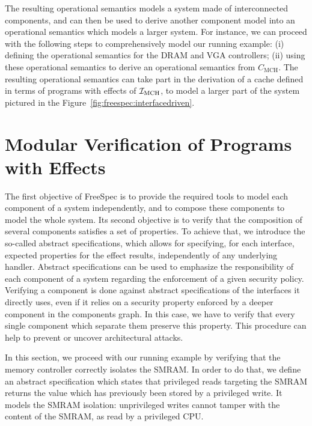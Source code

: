 %
The resulting operational semantics models a system made of interconnected
components, and can then be used to derive another component model into an
operational semantics which models a larger system.
%
For instance, we can proceed with the following steps to comprehensively model
our running example: (i) defining the operational semantics for the DRAM and VGA
controllers; (ii) using these operational semantics to derive an operational
semantics from $C_{\mathrm{MCH}}$.
%
The resulting operational semantics can take part in the derivation of a cache
defined in terms of programs with effects of $\mathcal{I}_{\mathrm{MCH}}$, to model a
larger part of the system pictured in the
Figure~\ref{fig:freespec:interfacedriven}.

\section{Modular Verification of Programs with Effects}
\label{sec:freespec:verifying}

The first objective of FreeSpec is to provide the required tools to model each
component of a system independently, and to compose these components to model
the whole system.
%
Its second objective is to verify that the composition of several components
satisfies a set of properties.
%
To achieve that, we introduce the so-called abstract specifications, which
allows for specifying, for each interface, expected properties for the effect
results, independently of any underlying handler.
%
Abstract specifications can be used to emphasize the responsibility of each
component of a system regarding the enforcement of a given security policy.
%
Verifying a component is done against abstract specifications of the interfaces
it directly uses, even if it relies on a security property enforced by a deeper
component in the components graph.
%
In this case, we have to verify that every single component which separate them
preserve this property.
%
This procedure can help to prevent or uncover architectural attacks.

In this section, we proceed with our running example by verifying that the
memory controller correctly isolates the SMRAM.
%
In order to do that, we define an abstract specification which states that
privileged reads targeting the SMRAM returns the value which has previously been
stored by a privileged write. It models the SMRAM isolation: unprivileged writes
cannot tamper with the content of the SMRAM, as read by a privileged CPU.


